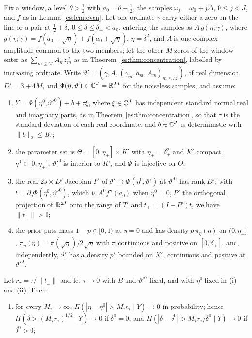 \begin{theorem}\label{es:thm:singular}
Fix a window, a level $\theta>\tfrac12$ with $a_0=\theta-\tfrac12$, the samples $\omega_j=\omega_0+j\Delta$, $0\le j<J$, and $f$ as in Lemma~\ref{es:lem:even}. Let one ordinate $\gamma$ carry either a zero on the line or a pair at $\tfrac12\pm\delta$, $0\le\delta\le\delta_+<a_0$, entering the samples as $A\,g(\eta;\gamma)$, where $g(\eta;\gamma)=f(a_0-\sqrt\eta)+f(a_0+\sqrt\eta)$, $\eta=\delta^2$, and $A$ is one complex amplitude common to the two members; let the other $M$ zeros of the window enter as $\sum_{m\le M}A_mz_m^{\,j}$ as in Theorem~\ref{es:thm:concentration}, labelled by increasing ordinate. Write $\vartheta'=(\gamma,A,(\gamma_m,a_m,A_m)_{m\le M})$, of real dimension $D'=3+4M$, and $\Phi(\eta,\vartheta')\in\mathbb{C}^J=\mathbb{R}^{2J}$ for the noiseless samples, and assume:
\begin{enumerate}
\item[(H1)] $Y=\Phi(\eta^0,\vartheta'^0)+b+\tau\xi$, where $\xi\in\mathbb{C}^J$ has independent standard normal real and imaginary parts, as in Theorem~\ref{es:thm:concentration}, so that $\tau$ is the standard deviation of each real coordinate, and $b\in\mathbb{C}^J$ is deterministic with $\|b\|_2\le B\tau$;
\item[(H2)] the parameter set is $\Theta=[0,\eta_+]\times K'$ with $\eta_+=\delta_+^2$ and $K'$ compact, $\eta^0\in[0,\eta_+)$, $\vartheta'^0$ is interior to $K'$, and $\Phi$ is injective on $\Theta$;
\item[(H3)] the real $2J\times D'$ Jacobian $T'$ of $\vartheta'\mapsto\Phi(\eta^0,\vartheta')$ at $\vartheta'^0$ has rank $D'$; with $t=\partial_\eta\Phi(\eta^0,\vartheta'^0)$, which is $A^0f''(a_0)$ when $\eta^0=0$, $P'$ the orthogonal projection of $\mathbb{R}^{2J}$ onto the range of $T'$ and $t_\perp=(I-P')t$, we have $\|t_\perp\|>0$;
\item[(H4)] the prior puts mass $1-p\in[0,1)$ at $\eta=0$ and has density $p\,\pi_\eta(\eta)$ on $(0,\eta_+]$, $\pi_\eta(\eta)=\pi(\sqrt\eta)/2\sqrt\eta$ with $\pi$ continuous and positive on $[0,\delta_+]$, and, independently, $\vartheta'$ has a density $p'$ bounded on $K'$, continuous and positive at $\vartheta'^0$.
\end{enumerate}
Let $r_\tau=\tau/\|t_\perp\|$ and let $\tau\to0$ with $B$ and $\vartheta'^0$ fixed, and with $\eta^0$ fixed in (i) and (ii). Then:
\begin{enumerate}
\item[(i)] for every $M_\tau\to\infty$, $\Pi(|\eta-\eta^0|>M_\tau r_\tau\mid Y)\to0$ in probability; hence $\Pi(\delta>(M_\tau r_\tau)^{1/2}\mid Y)\to0$ if $\delta^0=0$, and $\Pi(|\delta-\delta^0|>M_\tau r_\tau/\delta^0\mid Y)\to0$ if $\delta^0>0$;

\end{enumerate}
\end{theorem}
